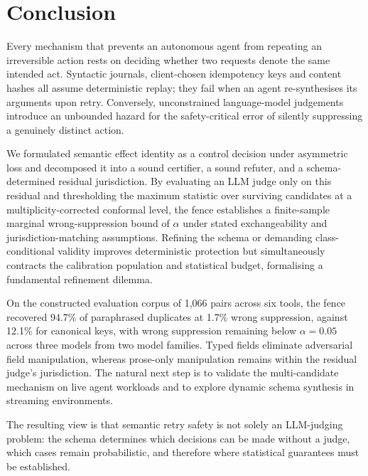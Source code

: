\section{Conclusion}\label{sec:conclusion}

Every mechanism that prevents an autonomous agent from repeating an irreversible action rests on deciding whether two requests denote the same intended act. Syntactic journals, client-chosen idempotency keys and content hashes all assume deterministic replay; they fail when an agent re-synthesises its arguments upon retry. Conversely, unconstrained language-model judgements introduce an unbounded hazard for the safety-critical error of silently suppressing a genuinely distinct action.

We formulated semantic effect identity as a control decision under asymmetric loss and decomposed it into a sound certifier, a sound refuter, and a schema-determined residual jurisdiction. By evaluating an LLM judge only on this residual and thresholding the maximum statistic over surviving candidates at a multiplicity-corrected conformal level, the fence establishes a finite-sample marginal wrong-suppression bound of $\alpha$ under stated exchangeability and jurisdiction-matching assumptions. Refining the schema or demanding class-conditional validity improves deterministic protection but simultaneously contracts the calibration population and statistical budget, formalising a fundamental refinement dilemma.

On the constructed evaluation corpus of 1,066 pairs across six tools, the fence recovered 94.7\% of paraphrased duplicates at 1.7\% wrong suppression, against 12.1\% for canonical keys, with wrong suppression remaining below $\alpha=0.05$ across three models from two model families. Typed fields eliminate adversarial field manipulation, whereas prose-only manipulation remains within the residual judge's jurisdiction. The natural next step is to validate the multi-candidate mechanism on live agent workloads and to explore dynamic schema synthesis in streaming environments.

The resulting view is that semantic retry safety is not solely an LLM-judging problem: the schema determines which decisions can be made without a judge, which cases remain probabilistic, and therefore where statistical guarantees must be established.

